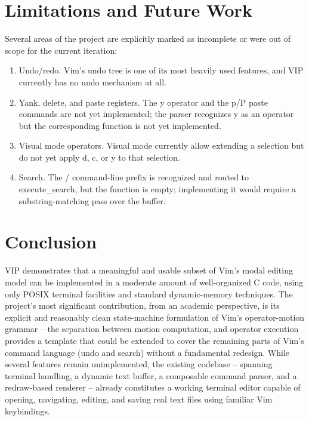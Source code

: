 \documentclass[journal]{IEEEtran}
\begin{document}
\section{Limitations and Future Work}
\label{sec:limitations-and-future-work}
Several areas of the project are explicitly marked as incomplete or were out of scope for the current iteration:

\begin{enumerate}
    \item Undo/redo. Vim's undo tree is one of its most heavily used features, and VIP currently has no undo mechanism at all.
    \item Yank, delete, and paste registers. The y operator and the p/P paste commands are not yet implemented; the parser recognizes y as an operator but the corresponding function is not yet implemented.
    \item Visual mode operators. Visual mode currently allow extending a selection but do not yet apply d, c, or y to that selection.
    \item Search. The / command-line prefix is recognized and routed to execute\_search, but the function is empty; implementing it would require a substring-matching pass over the buffer.
\end{enumerate}

\section{Conclusion}
VIP demonstrates that a meaningful and usable subset of Vim's modal editing model can be implemented in a moderate amount of well-organized C code, using only POSIX terminal facilities and standard dynamic-memory techniques. The project's most significant contribution, from an academic perspective, is its explicit and reasonably clean state-machine formulation of Vim's operator-motion grammar -- the separation between motion computation, and operator execution provides a template that could be extended to cover the remaining parts of Vim's command language (undo and search) without a fundamental redesign. While several features remain unimplemented, the existing codebase -- spanning terminal handling, a dynamic text buffer, a composable command parser, and a redraw-based renderer -- already constitutes a working terminal editor capable of opening, navigating, editing, and saving real text files using familiar Vim keybindings.



\end{document}

